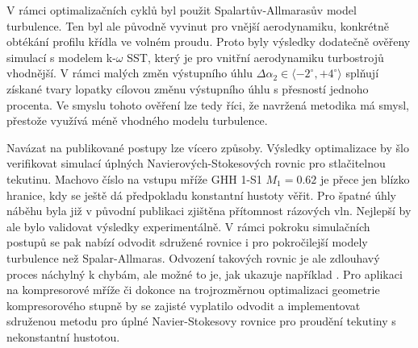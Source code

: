V rámci optimalizačních cyklů byl použit Spalartův-Allmarasův model turbulence. Ten byl ale původně vyvinut pro vnější aerodynamiku, konkrétně obtékání profilu křídla ve volném proudu. Proto byly výsledky dodatečně ověřeny simulací s modelem k-$ \omega $ SST, který je pro vnitřní aerodynamiku turbostrojů vhodnější. V rámci malých změn výstupního úhlu $ \Delta\alpha_2 \in \langle -2^\circ,+4^\circ \rangle $ splňují získané tvary lopatky cílovou změnu výstupního úhlu s přesností jednoho procenta. Ve smyslu tohoto ověření lze tedy říci, že navržená metodika má smysl, přestože využívá méně vhodného modelu turbulence.

Navázat na publikované postupy lze vícero způsoby. Výsledky optimalizace by šlo verifikovat simulací úplných Navierových-Stokesových rovnic pro stlačitelnou tekutinu. Machovo číslo na vstupu mříže GHH 1-S1 $ M_1=0.62 $ je přece jen blízko hranice, kdy se ještě dá předpokladu konstantní hustoty věřit. Pro špatné úhly náběhu byla již v původní publikaci \cite{steinert1990design} zjištěna přítomnost rázových vln. Nejlepší by ale bylo validovat výsledky experimentálně.
\newpage
V rámci pokroku simulačních postupů se pak nabízí odvodit sdružené rovnice i pro pokročilejší modely turbulence než Spalar-Allmaras. Odvození takových rovnic je ale zdlouhavý proces náchylný k chybám, ale možné to je, jak ukazuje například \cite{kavvadias2015continuous}. Pro aplikaci na kompresorové mříže či dokonce na trojrozměrnou optimalizaci geometrie kompresorového stupně by se zajisté vyplatilo odvodit a implementovat sdruženou metodu pro úplné Navier-Stokesovy rovnice pro proudění tekutiny s nekonstantní hustotou. 





